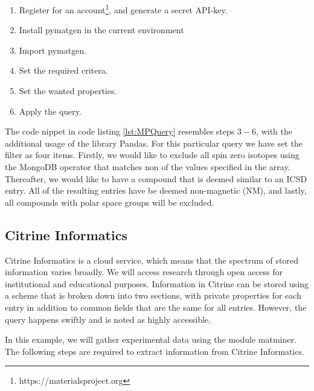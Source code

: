 \begin{enumerate}
  \item Register for an account\footnote{https://materialsproject.org}, and generate a secret API-key.
  \item Install pymatgen in the current environment
  \item Import pymatgen.
  \item Set the required critera.
  \item Set the wanted properties.
  \item Apply the query.
\end{enumerate}

The code nippet in code listing \ref{lst:MPQuery} resembles steps $3-6$, with the additional usage of the library Pandas. For this particular query we have set the filter as four items. Firstly, we would like to exclude all spin zero isotopes using the MongoDB operator that matches non of the values specified in the array. Thereafter, we would like to have a compound that is deemed similar to an ICSD entry. All of the resulting entries have be deemed non-magnetic (NM), and lastly, all compounds with polar space groups will be excluded.



\subsection{Citrine Informatics}

Citrine Informatics is a cloud service, which means that the spectrum of stored information varies broadly. We will access research through open access for institutional and educational purposes. Information in Citrine can be stored using a scheme that is broken down into two sections, with private properties for each entry in addition to common fields that are the same for all entries. However, the query happens swiftly and is noted as highly accessible.

In this example, we will gather experimental data using the module matminer. The following steps are required to extract information from Citrine Informatics.

